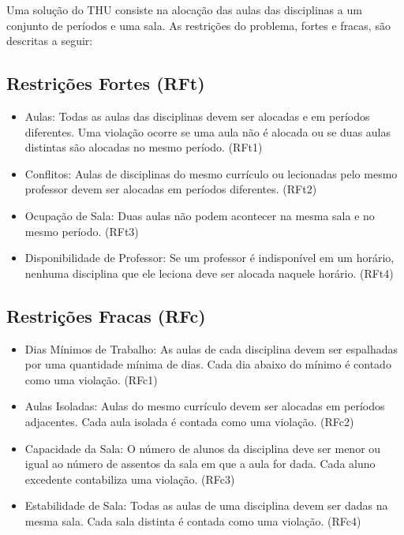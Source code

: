 \documentclass[11pt]{article}
\begin{document}
Uma solução do THU consiste na alocação das aulas das disciplinas a um conjunto de períodos e uma sala. As restrições do problema, fortes e fracas, são descritas a seguir:

\subsection{Restrições Fortes (RFt)}

\begin{itemize}

\item Aulas: Todas as aulas das disciplinas devem ser alocadas e em períodos diferentes. Uma violação ocorre se uma aula não é alocada ou se duas aulas distintas são alocadas no mesmo período. (RFt1)

\item Conflitos: Aulas de disciplinas do mesmo currículo ou lecionadas pelo mesmo professor devem ser alocadas em períodos diferentes. (RFt2)

\item Ocupação de Sala: Duas aulas não podem acontecer na mesma sala e no mesmo período. (RFt3)

\item Disponibilidade de Professor: Se um professor é indisponível em um horário, nenhuma disciplina que ele leciona deve ser alocada naquele horário. (RFt4)

\end{itemize}

\subsection{Restrições Fracas (RFc)}

\begin{itemize}

\item Dias Mínimos de Trabalho: As aulas de cada disciplina devem ser espalhadas por uma quantidade mínima de dias. Cada dia abaixo do mínimo é contado como uma violação. (RFc1)

\item Aulas Isoladas: Aulas do mesmo currículo devem ser alocadas em períodos adjacentes. Cada aula isolada é contada como uma violação. (RFc2)

\item Capacidade da Sala: O número de alunos da disciplina deve ser menor ou igual ao número de assentos da sala em que a aula for dada. Cada aluno excedente contabiliza uma violação. (RFc3)

\item Estabilidade de Sala: Todas as aulas de uma disciplina devem ser dadas na mesma sala. Cada sala distinta é contada como uma violação. (RFc4)

\end{itemize}
\end{document}
